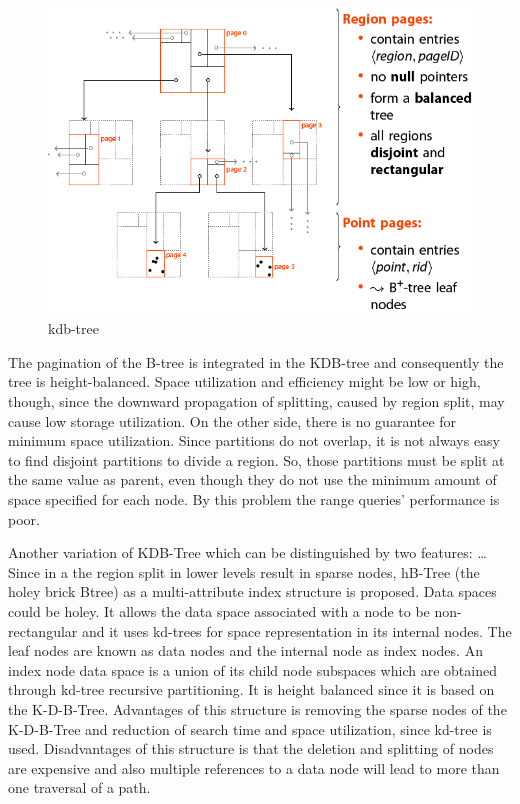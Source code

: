\documentclass[a4paper,12pt]{article}
\begin{document}
\begin{figure}
\centering
\includegraphics[width=\textwidth]{kdbtree}
\caption{kdb-tree}
\label{fig1}
\end{figure}

The pagination of the B-tree is integrated in the KDB-tree and consequently the tree is height-balanced. Space utilization and efficiency might be low or high, though, since the downward propagation of splitting, caused by region split, may cause low storage utilization. On the other side, there is no guarantee for minimum space utilization. Since partitions do not overlap, it is not always easy to find disjoint partitions to divide a region. So, those partitions must be split at the same value as parent, even though they do not use the minimum amount of space specified for each node. By this problem the range queries' performance is poor. 

Another variation of KDB-Tree which can be distinguished by two features: …
Since in a the region split in lower levels result in sparse nodes, hB-Tree (the holey brick Btree) as a multi-attribute index structure is proposed. Data spaces could be holey. It allows the data space associated with a node to be non-rectangular and it uses kd-trees for space representation in its internal nodes. The leaf nodes are known as data nodes and the internal node as index nodes. An index node data space is a union of its child node subspaces which are obtained through kd-tree recursive partitioning. It is height balanced since it is based on the K-D-B-Tree. 
Advantages of this structure is removing the sparse nodes of the K-D-B-Tree and reduction of search time and space utilization, since kd-tree is used. 
Disadvantages of this structure is that the deletion and splitting of nodes are expensive and also multiple references to a data node will lead to more than one traversal of a path.
\end{document}
